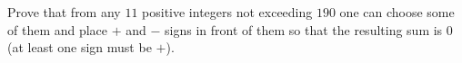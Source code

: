 Prove that from any $11$ positive integers not exceeding $190$ one can choose some of them and place $+$ and $-$ signs in front of them so that the resulting sum is $0$ (at least one sign must be $+$).
